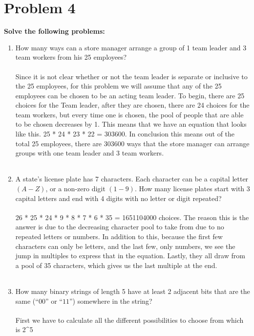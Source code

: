   \section*{Problem 4}
  {\bf Solve the following problems:}
  \begin{enumerate}[label=(\alph*)]
    \item How many ways can a store manager arrange a group of 1 team leader and 3 team workers from his 25 employees?
\\\\
  Since it is not clear whether or not the team leader is separate or inclusive to the 25 employees, for this problem we will assume that any of the 25 employees can be chosen to be an acting team leader. To begin, there are 25 choices for the Team leader, after they are chosen, there are 24 choices for the team workers, but every time one is chosen, the pool of people that are able to be chosen decreases by 1. This means that we have an equation that looks like this. 25 * 24 * 23 * 22 = 303600. In conclusion this means out of the total 25 employees, there are 303600 ways that the store manager can arrange groups with one team leader and 3 team workers.
\\\\
    \item A state’s license plate has 7 characters. Each character can be a capital letter $(A-Z)$, or a non-zero digit $(1-9)$. How many license plates start with 3 capital letters and end with 4 digits with no letter or digit repeated?
\\\\
  26 * 25 * 24 * 9 * 8 * 7 * 6 * 35 = 1651104000 choices. The reason this is the answer is due to the decreasing character pool to take from due to no repeated letters or numbers. In addition to this, because the first few characters can only be letters, and the last few, only numbers, we see the jump in multiples to express that in the equation. Lastly, they all draw from a pool of 35 characters, which gives us the last multiple at the end.
\\\\
    \item How many binary strings of length 5 have at least 2 adjacent bits that are the same (``$00$'' or ``$11$'') somewhere in the string?
\\\\
  First we have to calculate all the different possibilities to choose from which is 2^5 \\
  

\end{enumerate}

